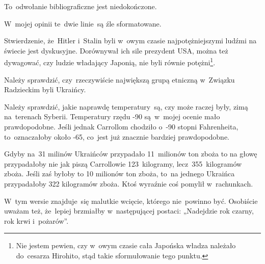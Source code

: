 \documentclass[a4paper,11pt]{article}
\begin{document}
\noindent
{} To~odwołanie bibliograficzne jest niedokończone.

\VerSpaceFour





\noindent
{} W~mojej opinii te~dwie linie~są źle sformatowane.

\VerSpaceFour





\noindent
{} Stwierdzenie, że~Hitler i~Stalin byli w~owym czasie
najpotężniejszymi ludźmi na świecie jest dyskusyjne. Dorównywał ich
sile prezydent USA, można też dywagować, czy ludzie władający Japonią,
nie byli równie potężni\footnote{Nie jestem pewien, czy w~owym czasie
  cała Japońska władza należało do~cesarza Hirohito, stąd takie
  sformułowanie tego punktu.}.

\VerSpaceFour





\noindent
{} Należy sprawdzić, czy~rzeczywiście największą grupą etniczną
w~Związku Radzieckim byli Ukraińcy.

\VerSpaceFour





\noindent
{} Należy sprawdzić, jakie naprawdę temperatury~są, czy może raczej
były, zimą na~terenach Syberii. Temperatury rzędu -90\textcelsius
są~w~mojej ocenie mało prawdopodobne. Jeśli jednak Carrollom chodziło
o~-90 stopni Fahrenheita, to~oznaczałoby około -65\textcelsius, co~jest
już znacznie bardziej prawdopodobne.

\VerSpaceFour





\noindent
{} Gdyby na~31 milinów Ukraińców przypadało 11~milionów ton
zboża to na głowę przypadałoby nie jak piszą Carrollowie
123~kilogramy, lecz~355~kilogramów zboża. Jeśli zaś byłoby to 10
milionów ton zboża, to~na jednego Ukraińca przypadałoby 322 kilogramów
zboża. Ktoś wyraźnie coś pomylił w~rachunkach.

\VerSpaceFour





\noindent
{} W~tym wersie znajduje~się malutkie wcięcie, którego
nie~powinno być. Osobiście uważam też, że~lepiej brzmiałby w~następującej
postaci: „Nadejdzie rok czarny, rok krwi i~pożarów”.
\end{document}
